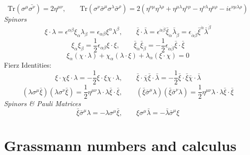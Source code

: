 \begin{equation}
	\text{Tr}(\sigma^{\mu}\bar{\sigma^{\nu}})=2\eta^{\mu\nu},\qquad \text{Tr}(\sigma^{\nu}\bar{\sigma}^{\mu}\sigma^{\lambda}\bar{\sigma}^{\rho})=2(\eta^{\nu\mu}\eta^{\lambda\rho}+\eta^{\mu\lambda}\eta^{\nu\rho}-\eta^{\nu\lambda}\eta^{\mu\rho}-i\epsilon^{\nu\mu\lambda\rho})
\end{equation}
\noindent \textit{Spinors}
\begin{equation}
	\xi \cdot \lambda = \epsilon^{\alpha\beta}\xi_{\alpha}\lambda_{\beta}=\epsilon_{\alpha\beta}\xi^{\alpha}\lambda^{\beta},\qquad \bar{\xi}\cdot \bar{\lambda}=\epsilon^{\dot{\alpha}\dot{\beta}}\bar{\xi}_{\dot{\alpha}}\bar{\lambda}_{\dot{\beta}} = \epsilon_{\dot{\alpha}\dot{\beta}}\bar{\xi}^{\dot{\alpha}}\bar{\lambda}^{\dot{\beta}}
\end{equation}
\begin{equation}
	\xi_{\alpha}\xi_{\beta}=\frac{1}{2}\epsilon_{\alpha\beta}\xi \cdot \xi,\qquad \bar{\xi}_{\dot{\alpha}}\bar{\xi}_{\dot{\beta}}=-\frac{1}{2}\epsilon_{\dot{\alpha}\dot{\beta}}\bar{\xi}\cdot\bar{\xi}
\end{equation}
\begin{equation}
	\xi_{\alpha}(\chi \cdot \lambda)+\chi_{\alpha}(\lambda \cdot \xi) + \lambda_{\alpha}(\xi \cdot \chi)=0
\end{equation}
Fierz Identities:
\begin{equation}
	\xi \cdot \chi \xi \cdot \lambda = -\frac{1}{2} \xi \cdot \xi \chi \cdot \lambda,\qquad 	\bar{\xi} \cdot \bar{\chi} \bar{\xi} \cdot \bar{\lambda} = -\frac{1}{2} \bar{\xi} \cdot \bar{\xi} \bar{\chi} \cdot \bar{\lambda}
\end{equation}
\begin{equation}
	(\lambda\sigma^{\mu}\bar{\xi})(\lambda\sigma^{\nu}\bar{\xi})=\frac{1}{2}\eta^{\mu\nu}\lambda \cdot \lambda \bar{\xi} \cdot \bar{\xi},\qquad (\bar{\xi}\bar{\sigma}^{\mu}\lambda)(\bar{\xi}\bar{\sigma}^{\nu}\lambda)=\frac{1}{2}\eta^{\mu\nu}\lambda \cdot \lambda \bar{\xi} \cdot \bar{\xi}
\end{equation}
\noindent \textit{Spinors \& Pauli Matrices}
\begin{equation}
	\bar{\xi}\bar{\sigma}^{\mu}\lambda=-\lambda\sigma^{\mu}\bar{\xi},\qquad \xi \sigma^{\mu} \bar{\lambda} = -\bar{\lambda} \bar{\sigma}^{\mu} \xi
\end{equation}

\section{Grassmann numbers and calculus}
\label{sec:grassman}

